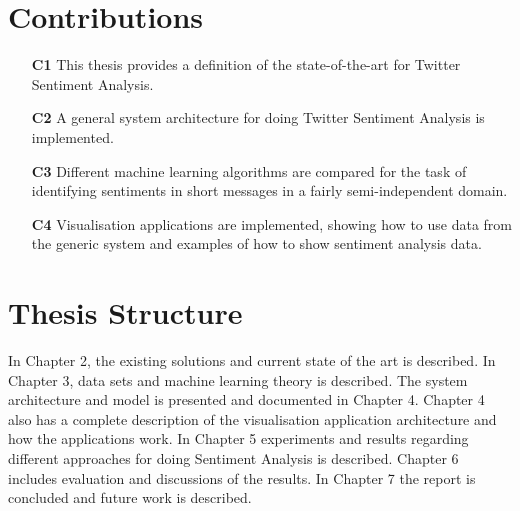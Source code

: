 	

\section{Contributions}
\label{sec:contribution}

\begin{itemize}
\item[\textbf{C1}] This thesis provides a definition of the state-of-the-art for Twitter Sentiment Analysis.

\item[\textbf{C2}] A general system architecture for doing Twitter Sentiment Analysis is implemented. 

\item[\textbf{C3}] Different machine learning algorithms are compared for the task of identifying sentiments in short messages in a fairly semi-independent domain.

\item[\textbf{C4}] Visualisation applications are implemented, showing how to use data from the generic system and examples of how to show sentiment analysis data.
 
\end{itemize}

\section{Thesis Structure}
\label{sec:structure}

In Chapter 2, the existing solutions and current state of the art is described. In Chapter 3, data sets and machine learning theory is described. The system architecture and model is presented and documented in Chapter 4. Chapter 4 also has a complete description of the visualisation application architecture and how the applications work. In Chapter 5 experiments and results regarding different approaches for doing Sentiment Analysis is described. Chapter 6 includes evaluation and discussions of the results. In Chapter 7 the report is concluded and future work is described. 




